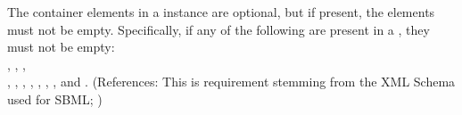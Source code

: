 The  container elements in a \Model instance are optional,
but if present, the elements must not be empty.  Specifically, if
any of the following are present in a \Model, they must not be empty:\\
,
,
,
\\ ,
, 
,
,
,
,
,
 and .  (References:
This is requirement stemming from the XML Schema used for SBML;
)
